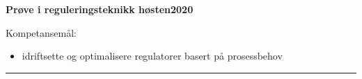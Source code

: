 \centerline{\bf Prøve i reguleringsteknikk høsten2020}  \bigskip

Kompetansemål:
\begin{itemize}[noitemsep]

	\item idriftsette og optimalisere regulatorer basert på prosessbehov
\end{itemize}
\bigskip 
\hrule
\vfil \eject
